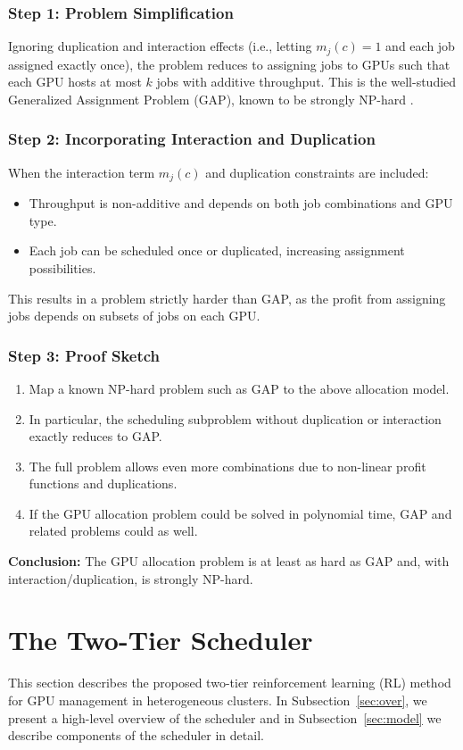 \documentclass{article}
\begin{document}
\subsubsection*{Step 1: Problem Simplification}
Ignoring duplication and interaction effects (i.e., letting $m_j(c)=1$ and each job assigned exactly once), the problem reduces to assigning jobs to GPUs such that each GPU hosts at most $k$ jobs with additive throughput. This is the well-studied Generalized Assignment Problem (GAP), known to be strongly NP-hard \cite{ShmoysTardos1993}.

\subsubsection*{Step 2: Incorporating Interaction and Duplication}
When the interaction term $m_j(c)$ and duplication constraints are included:
\begin{itemize}
    \item Throughput is non-additive and depends on both job combinations and GPU type.
    \item Each job can be scheduled once or duplicated, increasing assignment possibilities.
\end{itemize}
This results in a problem strictly harder than GAP, as the profit from assigning jobs depends on subsets of jobs on each GPU.

\subsubsection*{Step 3: Proof Sketch}
\begin{enumerate}
    \item Map a known NP-hard problem such as GAP to the above allocation model.
    \item In particular, the scheduling subproblem without duplication or interaction exactly reduces to GAP.
    \item The full problem allows even more combinations due to non-linear profit functions and duplications.
    \item If the GPU allocation problem could be solved in polynomial time, GAP and related problems could as well.
\end{enumerate}
\textbf{Conclusion:} The GPU allocation problem is at least as hard as GAP and, with interaction/duplication, is strongly NP-hard.

\section{The Two-Tier Scheduler}
\label{sec:method}
\label{sec:anon}
This section describes the proposed two-tier reinforcement learning (RL) method for GPU management in heterogeneous clusters. In Subsection~\ref{sec:over}, we present a high-level overview of the scheduler and in Subsection~\ref{sec:model} we describe components of the scheduler in detail. 
\end{document}
